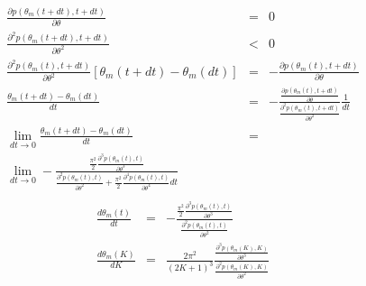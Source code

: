 \documentclass{article}
\begin{document}
\begin{eqnarray}
	\frac{\partial p(\theta_m(t+dt),t+dt)}{\partial \theta} & = & 0 \\
	\frac{\partial^2 p(\theta_m(t+dt),t+dt)}{\partial \theta^2} & < & 0  \\
	\frac{\partial^2 p(\theta_m(t),t+dt)}{\partial \theta^2} \left[ \theta_m(t+dt) - \theta_m(dt) \right] & = & - \frac{\partial p(\theta_m(t),t+dt)}{\partial \theta} \\
	\frac{ \theta_m(t+dt) - \theta_m(dt) }{dt} & = & - \frac{ \frac{\partial p(\theta_m(t),t+dt)}{\partial \theta}  }{ \frac{\partial^2 p(\theta_m(t),t+dt)}{\partial \theta^2}  } \frac{1}{dt} \\
	\lim_{dt \to 0 } \frac{ \theta_m(t+dt) - \theta_m(dt) }{dt} & = & \nonumber \\
	\lim_{dt \to 0 } - \frac{ \displaystyle \frac{\pi^2}{2} \frac{\partial^3 p(\theta_m(t),t)}{\partial \theta^3}  }{ \displaystyle \frac{\partial^2 p(\theta_m(t),t)}{\partial \theta^2} \nonumber
	                                                                       + \frac{\pi^2}{2} \frac{\partial^4 p(\theta_m(t),t)}{\partial \theta^4} dt  } \\
\end{eqnarray}
\begin{eqnarray}
									       \frac{d \theta_m(t)}{dt} & = & 
									       - \frac{ \displaystyle \frac{\pi^2}{2} \frac{\partial^3 p(\theta_m(t),t)}{\partial \theta^3}  }{ \displaystyle \frac{\partial^2 p(\theta_m(t),t)}{\partial \theta^2} }  \\
									       \frac{d \theta_m(K)}{dK} & = & 
									       \frac{2 \pi^2}{(2K+1)^3}
									       \frac{ \displaystyle \frac{\partial^3 p(\theta_m(K),K)}{\partial \theta^3}  }{ \displaystyle \frac{\partial^2 p(\theta_m(K),K)}{\partial \theta^2} } 
\end{eqnarray}
\end{document}
